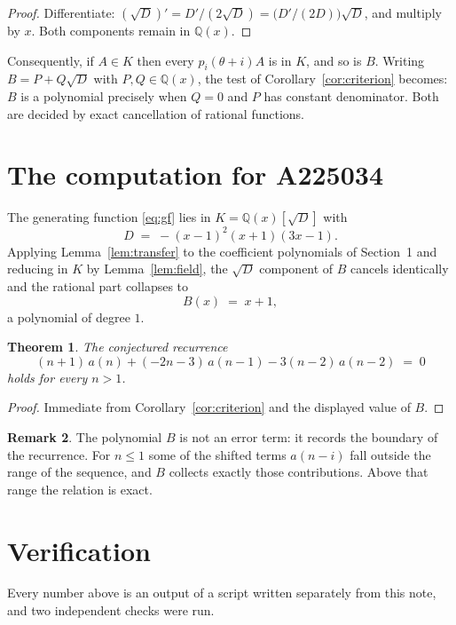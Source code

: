\documentclass[11pt,a4paper]{article}
\theoremstyle{plain}
\newtheorem{theorem}{Theorem}
\theoremstyle{definition}
\newtheorem{remark}[theorem]{Remark}
\begin{document}
\begin{proof}
Differentiate: $(\sqrt{D})'=D'/(2\sqrt{D})=\bigl(D'/(2D)\bigr)\sqrt{D}$, and multiply by
$x$. Both components remain in $\mathbb{Q}(x)$.
\end{proof}

Consequently, if $A\in K$ then every $p_{i}(\theta+i)A$ is in $K$, and so is $B$. Writing
$B=P+Q\sqrt{D}$ with $P,Q\in\mathbb{Q}(x)$, the test of Corollary~\ref{cor:criterion}
becomes: $B$ is a polynomial precisely when $Q=0$ and $P$ has constant denominator. Both
are decided by exact cancellation of rational functions.

\section{The computation for A225034}

The generating function \eqref{eq:gf} lies in $K=\mathbb{Q}(x)[\sqrt{D}]$ with
\[
D \;=\; - \left(x - 1\right)^{2} \left(x + 1\right) \left(3 x - 1\right) .
\]
Applying Lemma~\ref{lem:transfer} to the coefficient polynomials of Section~1 and reducing
in $K$ by Lemma~\ref{lem:field}, the $\sqrt{D}$ component of $B$ cancels identically and
the rational part collapses to
\[
B(x)\;=\;x + 1 ,
\]
a polynomial of degree $1$.

\begin{theorem}
The conjectured recurrence
\[
(n + 1)\,a(n) + (- 2 n - 3)\,a(n-1) -  3 \left(n - 2\right)\,a(n-2) \;=\;0
\]
holds for every $n>1$.
\end{theorem}

\begin{proof}
Immediate from Corollary~\ref{cor:criterion} and the displayed value of $B$.
\end{proof}

\begin{remark}
The polynomial $B$ is not an error term: it records the boundary of the recurrence. For
$n\le1$ some of the shifted terms $a(n-i)$ fall outside the range of the sequence,
and $B$ collects exactly those contributions. Above that range the relation is exact.
\end{remark}

\section{Verification}

Every number above is an output of a script written separately from this note, and two
independent checks were run.
\end{document}
